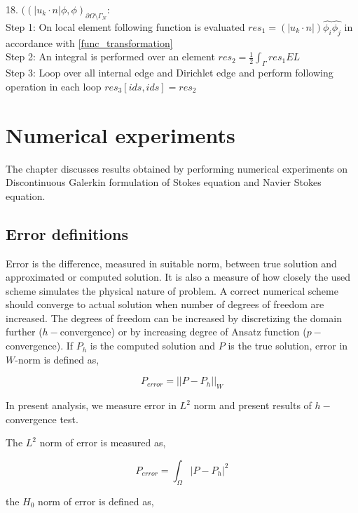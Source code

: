 \documentclass[a4paper,12pt]{book}
\begin{document}
18. $((|u_k \cdot n| \phi,\phi)_{\partial \Omega \setminus \Gamma_N}$:\\
Step 1: On local element following function is evaluated $res_1 = (|u_k \cdot n|) \hat{\phi_i} \hat{\phi_j} $ in accordance with \ref{func_transformation}\\
Step 2: An integral is performed over an element $res_2 = \frac{1}{2} \int_{\Gamma} res_1 EL $\\
Step 3: Loop over all internal edge and Dirichlet edge and perform following operation in each loop $res_3[ids,ids] = res_2$\\

\chapter{Numerical experiments}

The chapter discusses results obtained by performing numerical experiments on Discontinuous Galerkin formulation of Stokes equation and Navier Stokes equation.

\section{Error definitions}

Error is the difference, measured in suitable norm, between true solution and approximated or computed solution. It is also a measure of how closely the used scheme simulates the physical nature of problem. A correct numerical scheme should converge to actual solution when number of degrees of freedom are increased. The degrees of freedom can be increased by discretizing the domain further ($h-$convergence) or by increasing degree of Ansatz function ($p-$convergence). If $P_h$ is the computed solution and $P$ is the true solution, error in $W$-norm is defined as,

\begin{equation} \label{error_definition}
P_{error} = ||P - P_h||_{W}
\end{equation}

In present analysis, we measure error in $L^2$ norm and present results of $h-$convergence test.

The $L^2$ norm of error is measured as,

\begin{equation}
P_{error} = \int_{\Omega} |P - P_h|^2
\end{equation}

the $H_0$ norm of error is defined as,
\end{document}
